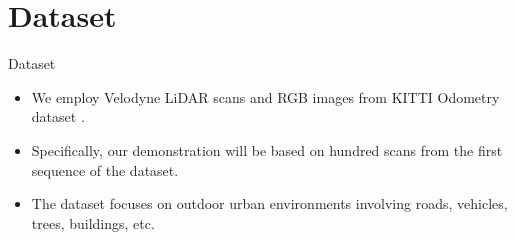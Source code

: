 \section{Dataset}

\begin{frame}{Dataset}
\begin{itemize}
\item We employ Velodyne LiDAR scans and RGB images from KITTI Odometry dataset \cite{Geiger2013}.
\item Specifically, our demonstration will be based on hundred scans from the first sequence of the dataset.
\item The dataset focuses on outdoor urban environments involving roads, vehicles, trees, buildings, etc.
\end{itemize}
\end{frame}

